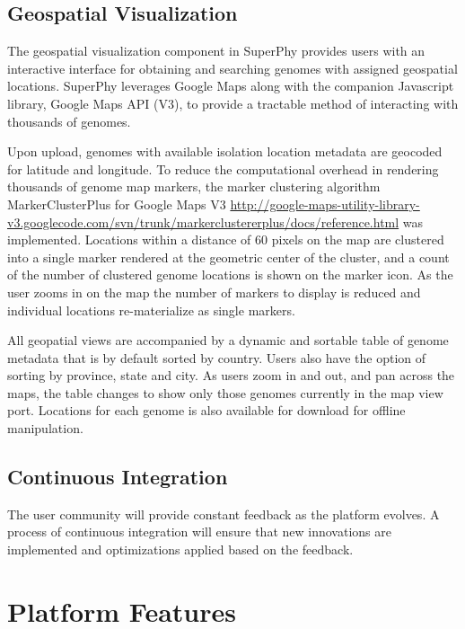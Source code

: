 \documentclass[doublespacing, linenumbers]{bmcart}
\begin{document}
\subsection{Geospatial Visualization}
The geospatial visualization component in SuperPhy provides users with an interactive interface for obtaining and searching genomes with assigned geospatial locations. SuperPhy leverages Google Maps along with the companion Javascript library, Google Maps API (V3), to provide a tractable method of interacting with thousands of genomes. 

Upon upload, genomes with available isolation location metadata are geocoded for latitude and longitude. To reduce the computational overhead in  rendering thousands of genome map markers, the marker clustering algorithm MarkerClusterPlus for Google Maps V3 \url{http://google-maps-utility-library-v3.googlecode.com/svn/trunk/markerclustererplus/docs/reference.html} was implemented. Locations within a distance of 60 pixels on the map are clustered into a single marker rendered at the geometric center of the cluster, and a count of the number of clustered genome locations is shown on the marker icon. As the user zooms in on the map the number of markers to display is reduced and individual locations re-materialize as single markers.

All geopatial views are accompanied by a dynamic and sortable table of genome metadata that is by default sorted by country. Users also have the option of sorting by province, state and city. As users zoom in and out, and pan across the maps, the table changes to show only those genomes currently in the map view port. Locations for each genome is also available for download for offline manipulation.

\subsection{Continuous Integration}
The user community will provide constant feedback as the platform evolves. A process of continuous integration will ensure that new innovations are implemented and optimizations applied based on the feedback.

\section{Platform Features}
\end{document}
